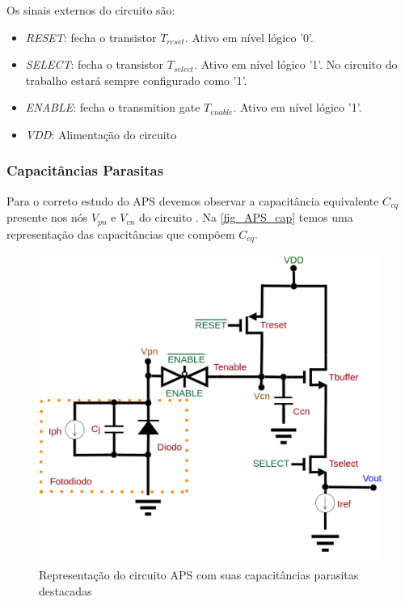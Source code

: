     Os sinais externos do circuito são:
    
\begin{itemize}
    \item \textit{RESET}: fecha o transistor $T_{reset}$. Ativo em n\'ivel l\'ogico '0'.
     \item \textit{SELECT}: fecha o transistor $T_{select}$. Ativo em n\'ivel l\'ogico '1'. No circuito do trabalho estar\'a sempre configurado como '1'.
     \item \textit{ENABLE}: fecha o transmition gate $T_{enable}$. Ativo em n\'ivel l\'ogico '1'.
     \item \textit{VDD}: Alimentação do circuito
\end{itemize}

\subsubsection{Capacit\^ancias Parasitas}
Para o correto estudo do APS devemos observar a capacit\^ancia equivalente $C_{eq}$ presente nos n\'os $V_{pn}$ e $V_{cn}$ do circuito \cite{LidianeCampos}. Na \autoref{fig_APS_cap} temos uma representação das capacit\^ancias que compõem $C_{eq}$.

\begin{figure}[!h]
	\caption{\label{fig_APS_cap}Representação do circuito APS com suas capacit\^ancias parasitas destacadas}
	\begin{center}
	    \includegraphics[scale=0.3]{Circuitos/APS_cap.png}
	\end{center}
\end{figure}

